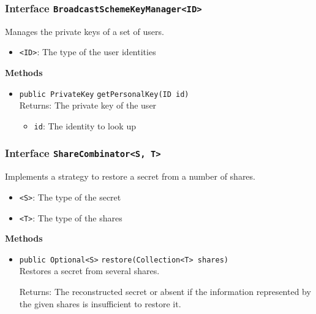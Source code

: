 \subsubsection{Interface \lstinline|BroadcastSchemeKeyManager<ID>|}
Manages the private keys of a set of users. \\



\begin{itemize}
\item \lstinline|<ID>|: The type of the user identities
\end{itemize}



\textbf{Methods}
\begin{itemize}
\item \lstinline|public PrivateKey| \lstinline|getPersonalKey|\lstinline|(ID id)|\\
Returns: The private key of the user
\begin{itemize}
\item \lstinline|id|: The identity to look up
\end{itemize}



\end{itemize}

\subsubsection{Interface \lstinline|ShareCombinator<S, T>|}
Implements a strategy to restore a secret from a number of shares. \\



\begin{itemize}
\item \lstinline|<S>|: The type of the secret
\item \lstinline|<T>|: The type of the shares
\end{itemize}



\textbf{Methods}
\begin{itemize}
\item \lstinline|public Optional<S>| \lstinline|restore|\lstinline|(Collection<T> shares)|\\
Restores a secret from several shares.

Returns: The reconstructed secret or absent if the information represented
 by the given shares is insufficient to restore it.

\end{itemize}


